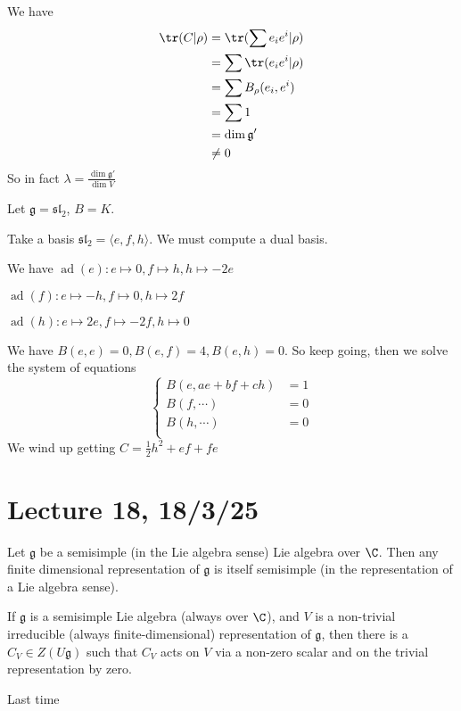 \documentclass[x11names,reqno,14pt]{extarticle}
\newcommand{\mk}[1]{\mathfrak{#1}}
\newcommand{\g}{\mk{g}}
\DeclareMathOperator{\ad}{ad}
\renewcommand{\sl}{\mk{s}\mk{l}}
\begin{document}
We have 
\begin{align*}
\tr(C|\rho) & = \tr(\sum e_ie^i|\rho) \\
& = \sum \tr(e_ie^i|\rho) \\
& = \sum B_\rho(e_i,e^i) \\
& = \sum 1 \\
& = \dim \g'\\
&\neq 0
\end{align*}
So in fact $\lambda = \frac{\dim \g'}{\dim V}$

\proof

\exm

Let $\g = \sl_2$, $B = K$. 

Take a basis $\sl_2 = \langle e, f, h \rangle$. We must compute a dual basis. 

We have $\ad(e): e \mapsto 0, f\mapsto h, h \mapsto -2e$

$\ad(f): e\mapsto -h, f \mapsto 0, h \mapsto 2f$

$\ad(h): e \mapsto 2e, f \mapsto -2f, h \mapsto 0$

We have $B(e,e) = 0, B(e, f) = 4, B(e,h) = 0$. So keep going, then we solve the system of equations 
\[
\begin{cases} B(e,ae + bf + ch) & = 1\\
B(f, \cdots) & = 0 \\
B(h,\cdots) & = 0 \\
\end{cases}
\]
We wind up getting $C = \frac12 h^2 + ef + fe$

\section*{Lecture 18, 18/3/25}

\thm

Let $\g$ be a semisimple (in the Lie algebra sense) Lie algebra over $\C$. Then any finite dimensional representation of $\g$ is itself semisimple (in the representation of a Lie algebra sense). 

\proof

\prop 

If $\g$ is a semisimple Lie algebra (always over $\C$), and $V$ is a non-trivial irreducible (always finite-dimensional) representation of $\g$, then there is a $C_V \in Z(U\g)$ such that $C_V$ acts on $V$ via a non-zero scalar and on the trivial representation by zero. 

\proof

Last time
\end{document}

